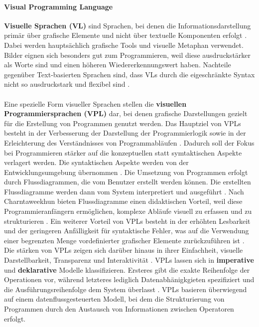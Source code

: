 \documentclass{article}
\begin{document}
    \paragraph{Visual Programming Language}
    \textbf{Visuelle Sprachen (VL)} sind Sprachen, bei denen die Informationsdarstellung primär über grafische Elemente und nicht über textuelle Komponenten erfolgt \cite{5}.
    Dabei werden hauptsächlich grafische Tools und visuelle Metaphan verwendet. 
    Bilder eignen sich besonders gut zum Programmieren, weil diese ausdruckstärker als Worte sind und einen höheren Wiedererkennungswert haben.
    Nachteile gegenüber Text-basierten Sprachen sind, dass VLs durch die eigeschränkte Syntax nicht so ausdruckstark und flexibel sind \cite{16}.\\
    \\
    Eine spezielle Form visueller Sprachen stellen die \textbf{visuellen Programmiersprachen (VPL)} dar, bei denen grafische Darstellungen gezielt für die Erstellung von Programmen genutzt werden.    
    Das Hauptziel von VPLs besteht in der Verbesserung der Darstellung der Programmierlogik sowie in der Erleichterung des Verständnisses von Programmabläufen \cite{13}.
    Dadurch soll der Fokus bei Programmieren stärker auf die konzeptuellen statt symtaktischen Aspekte verlagert werden. 
    Die syntaktischen Aspekte werden von der Entwicklungsumgebung übernommen \cite{10}.
    Die Umsetzung von Programmen erfolgt durch Flussdiagrammen, die vom Benutzer erstellt werden können. 
    Die erstellten Flussdiagramme werden dann vom System interpretiert und ausgeführt \cite{12}.
    Nach Charntaweekhun bieten Flussdiagramme einen didaktischen Vorteil, weil diese Programmieranfängern ermöglichen, komplexe Abläufe visuell zu erfassen und zu strukturieren \cite{12}.
    Ein weiterer Vorteil von VPLs besteht in der erhöhten Lesbarkeit und der geringeren Anfälligkeit für syntaktische Fehler, was auf die Verwendung einer begrenzten Menge vordefinierter grafischer Elemente zurückzuführen ist \cite{10}.
    Die stärken von VPLs zeigen sich darüber hinaus in ihrer Einfachheit, visuelle Darstellbarkeit, Transparenz und Interaktivität \cite{13}.
    VPLs lassen sich in \textbf{imperative} und \textbf{deklarative} Modelle klassifizieren. Ersteres gibt die exakte Reihenfolge der Operationen vor, während letzteres lediglich Datenabhänigkgieten spezifiziert und die Ausführungsreihenfolge dem System überlasst \cite{21}.
    VPLs basieren überwiegend auf einem datenflussgesteuerten Modell, bei dem die Strukturierung von Programmen durch den Austausch von Informationen zwischen Operatoren erfolgt. \cite{6}
\end{document}
